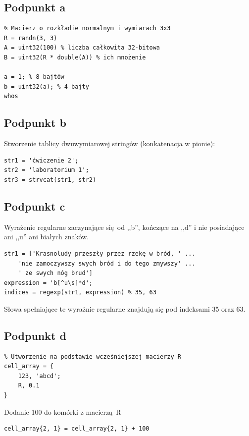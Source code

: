 \documentclass[a4paper, 12pt, titlepage]{article}
\begin{document}
        \subsection{Podpunkt a}
\begin{lstlisting}
% Macierz o rozkładie normalnym i wymiarach 3x3
R = randn(3, 3) 
A = uint32(100) % liczba całkowita 32-bitowa
B = uint32(R * double(A)) % ich mnożenie

a = 1; % 8 bajtów
b = uint32(a); % 4 bajty
whos
\end{lstlisting}

        \subsection{Podpunkt b}
            Stworzenie tablicy dwuwymiarowej stringów (konkatenacja w
            pionie):
\begin{lstlisting}
str1 = 'ćwiczenie 2';
str2 = 'laboratorium 1';
str3 = strvcat(str1, str2)
\end{lstlisting}

        \subsection{Podpunkt c}
            Wyrażenie regularne zaczynające się od ,,b'', kończące na
            ,,d'' i nie posiadające ani ,,u'' ani białych znaków.
\begin{lstlisting}
str1 = ['Krasnoludy przeszły przez rzekę w bród, ' ...
    'nie zamoczywszy swych bród i do tego zmywszy' ...
    ' ze swych nóg brud']
expression = 'b[^u\s]*d'; 
indices = regexp(str1, expression) % 35, 63 
\end{lstlisting}
            Słowa spełniające te wyrażnie regularne znajdują się pod
            indeksami 35 oraz 63.

        \subsection{Podpunkt d}
\begin{lstlisting}
% Utworzenie na podstawie wcześniejszej macierzy R
cell_array = {
    123, 'abcd';
    R, 0.1
}
\end{lstlisting}
                Dodanie 100 do komórki z macierzą R
\begin{lstlisting}
cell_array{2, 1} = cell_array{2, 1} + 100
\end{lstlisting}
\end{document}
